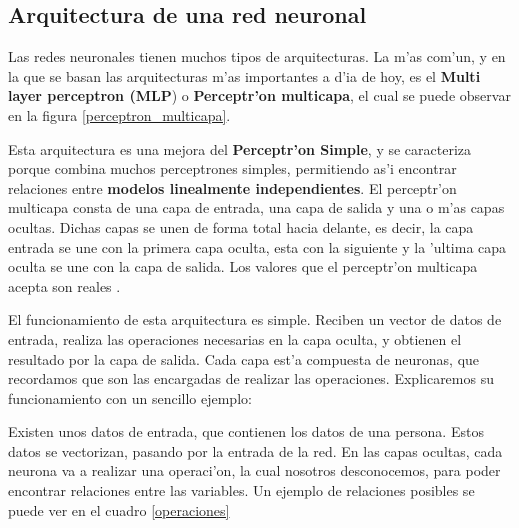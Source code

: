\subsection{Arquitectura de una red neuronal}

Las redes neuronales tienen muchos tipos de arquitecturas. 
La m'as com'un, y en la que se basan las arquitecturas m'as importantes a d'ia de hoy, es el \textbf{Multi layer perceptron (MLP}) o \textbf{Perceptr'on multicapa}, el cual se puede observar en la figura \ref{perceptron_multicapa}.


Esta arquitectura es una mejora del \textbf{Perceptr'on Simple}, y se caracteriza porque combina muchos perceptrones simples, permitiendo as'i encontrar relaciones entre \textbf{modelos linealmente independientes}. 
El perceptr'on multicapa consta de una capa de entrada, una capa de salida y una o m'as capas ocultas. Dichas capas se unen de forma total hacia delante, es decir, la capa entrada se une con la primera capa oculta, esta con la siguiente y la 'ultima capa oculta se une con la capa de salida. Los valores que el perceptr'on multicapa acepta son reales \cite{deep3}.

\clearpage

El funcionamiento de esta arquitectura es simple. Reciben un vector de datos de entrada, realiza las operaciones necesarias en la capa oculta, y obtienen el resultado por la capa de salida. Cada capa est'a compuesta de neuronas, que recordamos que son las encargadas de realizar las operaciones. 
Explicaremos su funcionamiento con un sencillo ejemplo:


Existen unos datos de entrada, que contienen los datos de una persona. Estos datos se vectorizan, pasando por la entrada de la red.
En las capas ocultas, cada neurona va a realizar una operaci'on, la cual nosotros desconocemos, para poder encontrar relaciones entre las variables. Un ejemplo de relaciones posibles se puede ver en el cuadro \ref{operaciones}


